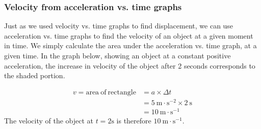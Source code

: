         \label{m38795*uid115}
\subsubsection*{Velocity from acceleration vs. time graphs}
            \nopagebreak
          \label{m38795*id72754}Just as we used velocity vs. time graphs to find displacement, we can use acceleration vs. time graphs to find the velocity of an object at a given moment in time. We simply calculate the area under the acceleration vs. time graph, at a given time. In the graph below, showing an object at a constant positive acceleration, the increase in velocity of the object after 2 seconds corresponds to the shaded portion.\par 
          \label{m38795*id72760}\nopagebreak\noindent{}
            
    \begin{align*}
    v=\text{area}~\text{of}~\text{rectangle}&= a\ensuremath{\times}\Delta t\\ 
      &= 5~\text{m}\ensuremath{\cdot}{\text{s}}^{-2}\ensuremath{\times}2~\text{s}\\ 
      &= 10~\text{m}\ensuremath{\cdot}{\text{s}}^{-1}
      \end{align*}
          \label{m38795*id72897}The velocity of the object at $t=2\text{s}$ is therefore $10~\text{m}\ensuremath{\cdot}\text{s}{}^{-1}$. %
    \label{m38795*cid8}
